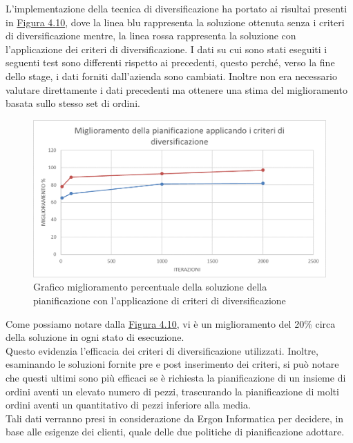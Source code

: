 L'implementazione della tecnica di diversificazione ha portato ai risultai presenti in \hyperref[4.10]{Figura 4.10}, dove la linea blu rappresenta la soluzione ottenuta senza i criteri di diversificazione
mentre, la linea rossa rappresenta la soluzione con l'applicazione dei criteri di diversificazione. I dati su cui sono stati eseguiti i seguenti test sono differenti rispetto ai
precedenti, questo perché, verso la fine dello stage, i dati forniti dall'azienda sono cambiati. Inoltre non era necessario valutare direttamente i dati precedenti ma ottenere
una stima del miglioramento basata sullo stesso set di ordini.

\begin{figure}[H]
	\includegraphics[width=13cm]{immagini/diversificazione.png}
	\centering
    \caption{Grafico miglioramento percentuale della soluzione della pianificazione con l'applicazione di criteri di diversificazione}
    \label{4.10}
\end{figure}

Come possiamo notare dalla \hyperref[4.10]{Figura 4.10}, vi è un miglioramento del 20\% circa della soluzione in ogni stato di esecuzione.\\
Questo evidenzia l'efficacia dei criteri di diversificazione utilizzati.
Inoltre, esaminando le soluzioni fornite pre e post inserimento dei criteri, si può notare che questi ultimi sono più efficaci se è richiesta la pianificazione di un insieme
di ordini aventi un elevato numero di pezzi, trascurando la pianificazione di molti ordini aventi un quantitativo di pezzi inferiore alla media.\\
Tali dati verranno presi in considerazione da Ergon Informatica per decidere, in base alle esigenze dei clienti, quale delle due politiche di pianificazione adottare.
